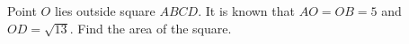 Point $O$ lies outside square $ABCD$. It is known that $AO=OB=5$ and $OD=\sqrt{13}$. Find the area of the square.
